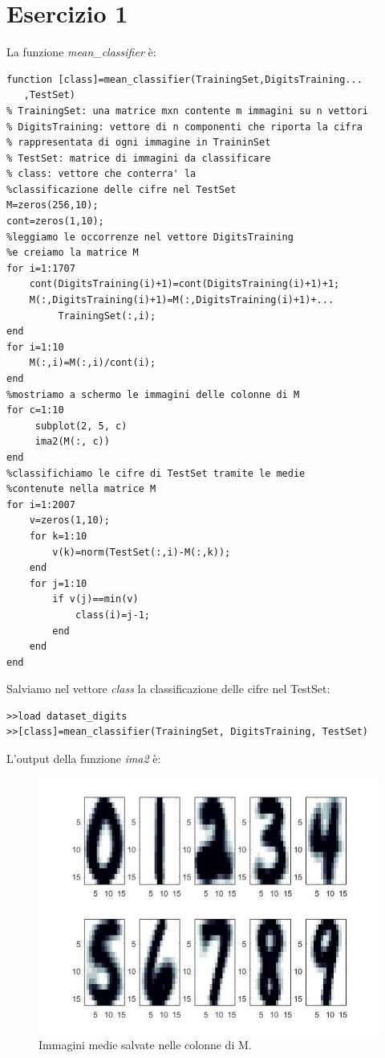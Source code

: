 \documentclass[11pt,a4paper,twoside,openright,titlepage,
                           headinclude,footinclude,BCOR5mm,
                           numbers=noenddot,cleardoublepage=empty,
                           tablecaptionabove]{scrbook}
\begin{document}
\section{Esercizio 1}
La funzione \emph{mean\_classifier} è:
\begin{lstlisting}[frame=trBL]
function [class]=mean_classifier(TrainingSet,DigitsTraining...
   ,TestSet)
% TrainingSet: una matrice mxn contente m immagini su n vettori
% DigitsTraining: vettore di n componenti che riporta la cifra
% rappresentata di ogni immagine in TraininSet
% TestSet: matrice di immagini da classificare
% class: vettore che conterra' la 
%classificazione delle cifre nel TestSet
M=zeros(256,10);
cont=zeros(1,10);
%leggiamo le occorrenze nel vettore DigitsTraining 
%e creiamo la matrice M
for i=1:1707
    cont(DigitsTraining(i)+1)=cont(DigitsTraining(i)+1)+1;
    M(:,DigitsTraining(i)+1)=M(:,DigitsTraining(i)+1)+...
         TrainingSet(:,i);
end
for i=1:10
    M(:,i)=M(:,i)/cont(i);
end
%mostriamo a schermo le immagini delle colonne di M
for c=1:10
     subplot(2, 5, c)
     ima2(M(:, c))
end
%classifichiamo le cifre di TestSet tramite le medie 
%contenute nella matrice M
for i=1:2007
    v=zeros(1,10);
    for k=1:10
        v(k)=norm(TestSet(:,i)-M(:,k));
    end
    for j=1:10
        if v(j)==min(v)
            class(i)=j-1;
        end
    end
end
\end{lstlisting}

Salviamo nel vettore \emph{class} la classificazione delle cifre nel TestSet:
\begin{lstlisting}[frame=lines]
>>load dataset_digits
>>[class]=mean_classifier(TrainingSet, DigitsTraining, TestSet)
\end{lstlisting}
L'output della funzione \emph{ima2} è:
\begin{figure}[h!]
\begin{center}
\includegraphics[width=\textwidth]{figs/ima2.jpg}
\caption{Immagini medie salvate nelle colonne di M.}
\end{center}
\end{figure}
\end{document}
